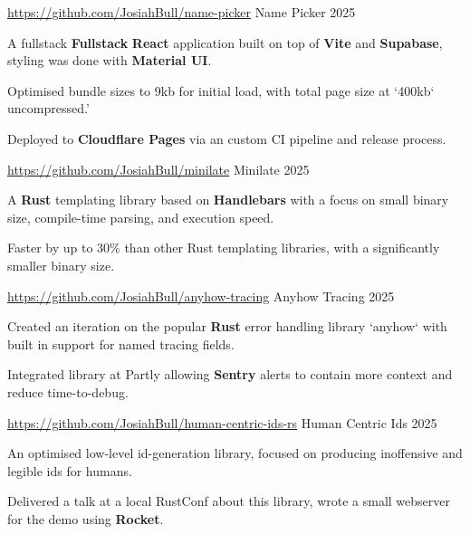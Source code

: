 
\begin{cventries}
  \cventry
    {\href{https://github.com/JosiahBull/name-picker}{\faLink \space https://github.com/JosiahBull/name-picker}}
    {Name Picker}
    {}
    {2025}
    {
      \begin{cvitems}
        \item {A fullstack \textbf{Fullstack} \textbf{React} application built on top of \textbf{Vite} and \textbf{Supabase}, styling was done with \textbf{Material UI}.}
        \item {Optimised bundle sizes to 9kb for initial load, with total page size at `400kb` uncompressed.'}
        \item {Deployed to \textbf{Cloudflare Pages} via an custom CI pipeline and release process.}
      \end{cvitems}
    }

  \cventry
    {\href{https://github.com/JosiahBull/minilate}{\faLink \space https://github.com/JosiahBull/minilate}}
    {Minilate}
    {}
    {2025}
    {
      \begin{cvitems}
        \item {A \textbf{Rust} templating library based on \textbf{Handlebars} with a focus on small binary size, compile-time parsing, and execution speed.}
        \item {Faster by up to 30\% than other Rust templating libraries, with a significantly smaller binary size.}
      \end{cvitems}
    }

  \cventry
    {\href{https://github.com/JosiahBull/anyhow-tracing}{\faLink \space https://github.com/JosiahBull/anyhow-tracing}}
    {Anyhow Tracing}
    {}
    {2025}
    {
      \begin{cvitems}
        \item {Created an iteration on the popular \textbf{Rust} error handling library `anyhow` with built in support for named tracing fields.}
        \item {Integrated library at Partly allowing \textbf{Sentry} alerts to contain more context and reduce time-to-debug.}
      \end{cvitems}
    }

  \cventry
    {\href{https://github.com/JosiahBull/human-centric-ids-rs}{\faLink \space https://github.com/JosiahBull/human-centric-ids-rs}}
    {Human Centric Ids}
    {}
    {2025}
    {
      \begin{cvitems}
        \item {An optimised low-level id-generation library, focused on producing inoffensive and legible ids for humans.}
        \item {Delivered a talk at a local RustConf about this library, wrote a small webserver for the demo using \textbf{Rocket}.}
      \end{cvitems}
    }


\end{cventries}
